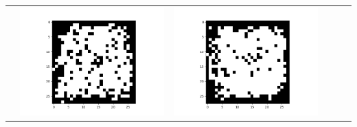 \documentclass[12pt]{report}
\begin{document}
\begin{table}[H]
\begin{tabular}{  c  c  c  c  c  c }
\begin{minipage}{.15\textwidth}
    \end{minipage} &
    \begin{minipage}{.15\textwidth}
      \includegraphics[scale=0.2]{BM_e4.png}
    \end{minipage} &
    \begin{minipage}{.15\textwidth}
      \includegraphics[scale=0.2]{BM_e16.png}
    \end{minipage} &
    \begin{minipage}{.15\textwidth}

\end{minipage}
\end{tabular}
\end{table}
\end{document}
